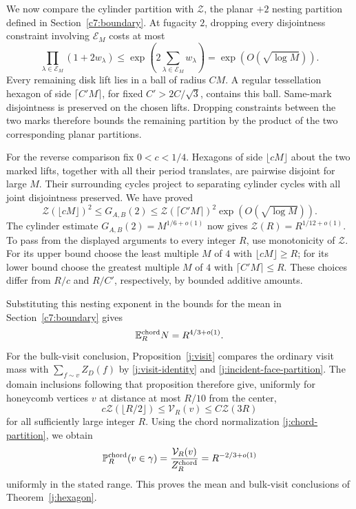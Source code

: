 We now compare the cylinder partition with \(\mathcal Z\), the planar
\(+2\) nesting partition defined in Section~\ref{c7:boundary}.
At fugacity \(2\), dropping every disjointness constraint involving
\(\mathcal E_M\) costs at most
\[
 \prod_{\lambda\in\mathcal E_M}(1+2w_\lambda)
 \le \exp\left(2\sum_{\lambda\in\mathcal E_M}w_\lambda\right)
 =\exp(O(\sqrt{\log M})).
\]
Every remaining disk lift lies in a ball of radius \(CM\). A regular
tessellation hexagon of side \(\lceil C'M\rceil\), for fixed
\(C'>2C/\sqrt3\), contains this ball. Same-mark disjointness is
preserved on the chosen lifts. Dropping constraints between the two
marks therefore bounds the remaining partition by the product of the
two corresponding planar partitions.

For the reverse comparison fix \(0<c<1/4\). Hexagons of side
\(\lfloor cM\rfloor\) about the two marked lifts, together with all
their period translates, are pairwise disjoint for large \(M\).
Their surrounding cycles project to separating cylinder cycles with
all joint disjointness preserved. We have proved
\[
 \mathcal Z(\lfloor cM\rfloor)^2
 \le G_{A,B}(2)
 \le \mathcal Z(\lceil C'M\rceil)^2
       \exp(O(\sqrt{\log M})).
\]
The cylinder estimate \(G_{A,B}(2)=M^{1/6+o(1)}\) now gives
\(\mathcal Z(R)=R^{1/12+o(1)}\). To pass from the displayed arguments
to every integer \(R\), use monotonicity of \(\mathcal Z\). For its upper
bound choose the least multiple \(M\) of \(4\) with
\(\lfloor cM\rfloor\ge R\); for its lower bound choose the greatest
multiple \(M\) of \(4\) with \(\lceil C'M\rceil\le R\).
These choices differ from \(R/c\) and \(R/C'\), respectively, by
bounded additive amounts.

Substituting this nesting exponent in the bounds for the mean in
Section~\ref{c7:boundary} gives
\[
 \mathbb E_R^{\rm chord}N=R^{4/3+o(1)}.
\]
For the bulk-visit conclusion, Proposition~\ref{j:visit} compares the
ordinary visit mass with \(\sum_{f\sim v}Z_D(f)\) by
\eqref{j:visit-identity} and \eqref{j:incident-face-partition}.
The domain inclusions following that proposition therefore give,
uniformly for honeycomb vertices \(v\) at distance at most \(R/10\)
from the center,
\[
 c\mathcal Z(\lfloor R/2\rfloor)
 \le \mathcal V_R(v)\le C\mathcal Z(3R)
\]
for all sufficiently large integer \(R\). Using the chord normalization
\eqref{j:chord-partition}, we obtain
\[
 \mathbb P_R^{\rm chord}(v\in\gamma)
   =\frac{\mathcal V_R(v)}{Z_R^{\rm chord}}
   =R^{-2/3+o(1)}
\]
uniformly in the stated range. This proves the mean and bulk-visit
conclusions of Theorem~\ref{j:hexagon}.
